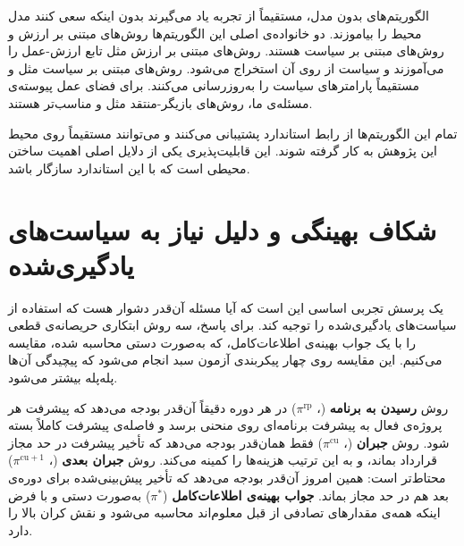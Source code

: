 الگوریتم‌های بدون مدل، مستقیماً از تجربه یاد می‌گیرند بدون
اینکه سعی کنند مدل محیط را بیاموزند. دو خانواده‌ی اصلی این
الگوریتم‌ها روش‌های مبتنی بر ارزش و روش‌های مبتنی بر سیاست
هستند. روش‌های مبتنی بر ارزش مثل  تابع ارزش-عمل را
می‌آموزند و سیاست از روی آن استخراج می‌شود. روش‌های مبتنی
بر سیاست مثل  و  مستقیماً پارامترهای سیاست
را به‌روزرسانی می‌کنند. برای فضای عمل پیوسته‌ی مسئله‌ی ما،
روش‌های بازیگر-منتقد مثل  و  مناسب‌تر هستند.

تمام این الگوریتم‌ها از رابط استاندارد  پشتیبانی
می‌کنند و می‌توانند مستقیماً روی محیط این پژوهش به کار گرفته
شوند. این قابلیت‌پذیری یکی از دلایل اصلی اهمیت ساختن محیطی
است که با این استاندارد سازگار باشد.

\section{شکاف بهینگی و دلیل نیاز به سیاست‌های یادگیری‌شده}
\label{sec:gap}

یک پرسش تجربی اساسی این است که آیا مسئله آن‌قدر دشوار هست که
استفاده از سیاست‌های یادگیری‌شده را توجیه کند.
برای پاسخ، سه روش ابتکاری حریصانه‌ی قطعی را با یک جواب بهینه‌ی
اطلاعات‌کامل، که به‌صورت دستی محاسبه شده، مقایسه می‌کنیم.
این مقایسه روی چهار پیکربندی آزمون سبد انجام می‌شود که پیچیدگی
آن‌ها پله‌پله بیشتر می‌شود.

روش \textbf{رسیدن به برنامه} (، $\pi^{\mathrm{rp}}$)
در هر دوره دقیقاً آن‌قدر بودجه می‌دهد که پیشرفت هر پروژه‌ی فعال به
پیشرفت برنامه‌ای روی منحنی  برسد و فاصله‌ی پیشرفت کاملاً بسته
شود.
روش \textbf{جبران } (، $\pi^{\mathrm{cu}}$)
فقط همان‌قدر بودجه می‌دهد که تأخیر پیشرفت در حد مجاز قرارداد بماند،
و به این ترتیب هزینه‌ها را کمینه می‌کند.
روش \textbf{جبران  بعدی} (،
$\pi^{\mathrm{cu}+1}$) محتاط‌تر است: همین امروز آن‌قدر بودجه
می‌دهد که تأخیر پیش‌بینی‌شده برای دوره‌ی بعد هم در حد مجاز بماند.
\textbf{جواب بهینه‌ی اطلاعات‌کامل} ($\pi^*$) به‌صورت دستی و با فرض
اینکه همه‌ی مقدارهای تصادفی از قبل معلوم‌اند محاسبه می‌شود و
نقش کران بالا را دارد.

